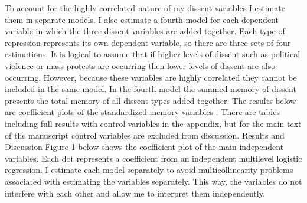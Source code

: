 \documentclass[ignorenonframetext,]{beamer}
\begin{document}
\begin{frame}[fragile]
To account for the highly correlated nature of my dissent variables I
estimate them in separate models. I also estimate a fourth model for
each dependent variable in which the three dissent variables are added
together. Each type of repression represents its own dependent variable,
so there are three sets of four estimations. It is logical to assume
that if higher levels of dissent such as political violence or mass
protests are occurring then lower levels of dissent are also occurring.
However, because these variables are highly correlated they cannot be
included in the same model. In the fourth model the summed memory of
dissent presents the total memory of all dissent types added together.
The results below are coefficient plots of the standardized memory
variables . There are tables including full results with control
variables in the appendix, but for the main text of the manuscript
control variables are excluded from discussion. Results and Discussion
Figure 1 below shows the coefficient plot of the main independent
variables. Each dot represents a coefficient from an independent
multilevel logistic regression. I estimate each model separately to
avoid multicollinearity problems associated with estimating the
variables separately. This way, the variables do not interfere with each
other and allow me to interpret them independently.


\end{frame}
\end{document}

